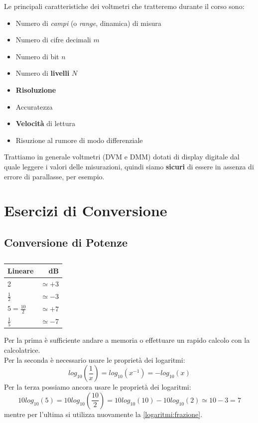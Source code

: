 \documentclass[a4paper,11pt]{report}
\begin{document}
Le principali caratteristiche dei voltmetri che tratteremo durante il corso sono:
\begin{itemize}
  \item Numero di \textit{campi} (o \textit{range}, dinamica) di misura
  \item Numero di cifre decimali $ m $
  \item Numero di bit $ n $
  \item Numero di \textbf{livelli} $ N $
  \item \textbf{Risoluzione}
  \item Accuratezza
  \item \textbf{Velocità} di lettura
  \item Risuzione al rumore di modo differenziale
\end{itemize}
Trattiamo in generale voltmetri (DVM e DMM) dotati di display digitale dal quale leggere i valori delle misurazioni, quindi siamo \textbf{sicuri} di essere in assenza di errore di parallasse, per esempio.
\chapter{Esercizi di Conversione}
\label{esercizi:conversione}
\section{Conversione di Potenze}
\begin{table}[H]
  \caption{}
  \label{tab:}

  \begin{center}
    \begin{tabular}{|l|r|}
    \hline
    Lineare                 & dB\\
    \hline
       2                    & $\simeq +3$ \\
    \hline
       $\frac{1}{2}$        & $\simeq -3$ \\
    \hline
       $5 = \frac{10}{2}$   & $\simeq +7$ \\
    \hline
       $\frac{1}{5}$        & $\simeq -7$ \\
    \hline
    \end{tabular}
  \end{center}
\end{table}
Per la prima è sufficiente andare a memoria o effettuare un rapido calcolo con la calcolatrice.\\
Per la seconda è necessario usare le proprietà dei logaritmi:
\begin{equation}
  \label{logaritmi:frazione}
  log_{10}(\frac{1}{x}) = log_{10}(x^{-1}) = -log_{10}(x)  
\end{equation}
Per la terza possiamo ancora usare le proprietà dei logaritmi:
\begin{equation}
  \label{logaritmi:differenza}
  10log_{10}(5) = 10log_{10}(\frac{10}{2}) = 10log_{10}(10)-10log_{10}(2) \simeq 10 - 3 = 7  
\end{equation}
mentre per l'ultima si utilizza nuovamente la \ref{logaritmi:frazione}.
\end{document}
